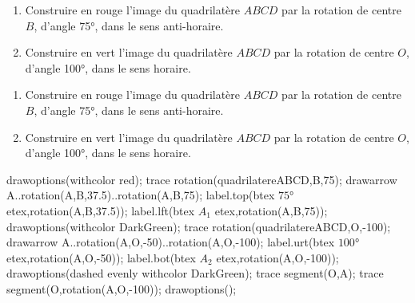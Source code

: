 \begin{exercice*}
    \begin{enumerate}
        \item Construire en rouge l'image du quadrilatère $ABCD$ par la rotation de centre $B$, d'angle \ang{75}, dans le sens anti-horaire.
        \item Construire en vert l'image du quadrilatère $ABCD$ par la rotation de centre $O$, d'angle \ang{100}, dans le sens horaire.
    \end{enumerate}
    \hspace*{-10mm}
    \begin{Geometrie}[CoinHD={(9u,7u)}]        
        \enonceTroisiemeGTroisExoOnze
    \end{Geometrie}
\end{exercice*}
\begin{corrige}
    \begin{enumerate}
        \item Construire en rouge l'image du quadrilatère $ABCD$ par la rotation de centre $B$, d'angle \ang{75}, dans le sens anti-horaire.
        \item Construire en vert l'image du quadrilatère $ABCD$ par la rotation de centre $O$, d'angle \ang{100}, dans le sens horaire.
    \end{enumerate}

    \hspace*{-10mm}
    \begin{Geometrie}[CoinHD={(9u,7u)}]        
        \enonceTroisiemeGTroisExoOnze
        drawoptions(withcolor red);
        trace rotation(quadrilatereABCD,B,75);
        drawarrow A..rotation(A,B,37.5)..rotation(A,B,75);
        label.top(btex $\ang{75}$ etex,rotation(A,B,37.5));
        label.lft(btex $A_1$ etex,rotation(A,B,75));
        drawoptions(withcolor DarkGreen);
        trace rotation(quadrilatereABCD,O,-100);         
        drawarrow A..rotation(A,O,-50)..rotation(A,O,-100);         
        label.urt(btex $\ang{100}$ etex,rotation(A,O,-50));
        label.bot(btex $A_2$ etex,rotation(A,O,-100));
        drawoptions(dashed evenly withcolor DarkGreen);
        trace segment(O,A);
        trace segment(O,rotation(A,O,-100));
        drawoptions(); 
    \end{Geometrie}
\end{corrige}

